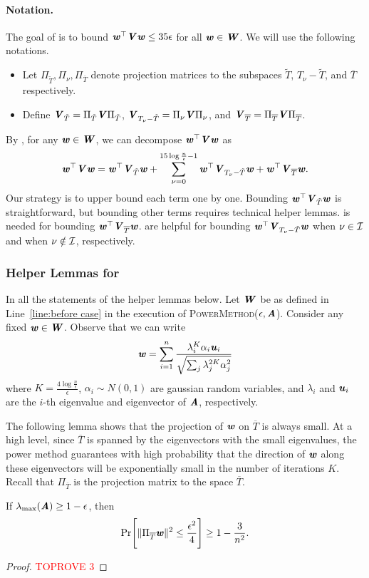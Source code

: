 \paragraph{Notation.}The goal of  is to bound $\ww^{\top}\VV\ww\leq 35 \epsilon$ for all $\ww\in \WW$. We will use the following notations.
\begin{itemize}
    \item Let $\Pi_{\tilde{T}},\Pi_{\nu},\Pi_{\overline{T}}$ denote projection matrices to the subspaces $\tilde{T}$, $T_{\nu}-\tilde{T}$, and $\overline{T}$ respectively.
    \item  Define $\VV_{\tilde{T}} = \Pi_{\tilde{T}}\VV\Pi_{\tilde{T}}$, $\VV_{T_{\nu}-\tilde{T}} = \Pi_{\nu}\VV\Pi_{\nu}$, and $\VV_{\overline{T}} = \Pi_{\overline{T}}\VV\Pi_{\overline{T}}$.
\end{itemize}
By , for any $\ww\in \WW$, we can decompose $\ww^{\top}\VV\ww$  as 
\[
\ww^{\top}\VV\ww = \ww^{\top}\VV_{\tilde{T}}\ww+\sum_{\nu = 0}^{15\log\frac{n}{\epsilon}-1}\ww^{\top}\VV_{T_{\nu} -\tilde{T}}\ww+ \ww^{\top}\VV_{\overline{T}}\ww.
\]
Our strategy is to upper bound each term one by one. Bounding $\ww^{\top}\VV_{\tilde{T}}\ww$ is straightforward, but bounding other terms requires technical helper lemmas.
 is needed for bounding $\ww^{\top}\VV_{\overline{T}}\ww$.
 are helpful for bounding $\ww^{\top}\VV_{T_{\nu} -\tilde{T}}\ww$ when $\nu \in \cal{I}$ and when $\nu \notin \cal{I}$, respectively.


\subsubsection*{Helper Lemmas for }
In all the statements of the helper lemmas below. Let $\WW$ be as defined in Line~\ref{line:before case} in the execution of \textsc{PowerMethod}($\epsilon,\AA$). Consider any fixed $\ww\in\WW$. Observe that we can write 
\begin{equation}\label{eq:rewrite w}  
\ww=\sum_{i=1}^{n}\frac{\lambda_{i}^{K}\alpha_{i}\uu_{i}}{\sqrt{\sum_{j}\lambda_{j}^{2K}\alpha_{j}^{2}}}
\end{equation}
where $K=\frac{4\log\frac{n}{\epsilon}}{\epsilon}$, $\alpha_{i}\sim N(0,1)$ are gaussian random variables, and $\lambda_i$ and $\uu_{i}$ are the $i$-th eigenvalue and eigenvector of $\AA$, respectively.

The following lemma shows that the projection of $\ww$ on $\overline{T}$ is always small. At a high level, 
since $\overline{T}$ is spanned by the eigenvectors with the small eigenvalues, the power method guarantees with high probability that the direction of $\ww$ along these eigenvectors will be exponentially small in the number of iterations $K$.
Recall that $\Pi_{\overline{T}}$ is the projection matrix to the space $\overline{T}$.
\begin{lemma}\label{lem:boundLowEV}
If $\lambda_{\max}(\AA)\geq 1-\epsilon$, then
\[
\Pr\left[\|\Pi_{\overline{T}}\ww\|^2 \leq \frac{\epsilon^2}{4}\right]\geq 1 - \frac{3}{n^2}.
\]
\end{lemma}
\begin{proof}\textcolor{red}{TOPROVE 3}\end{proof}


